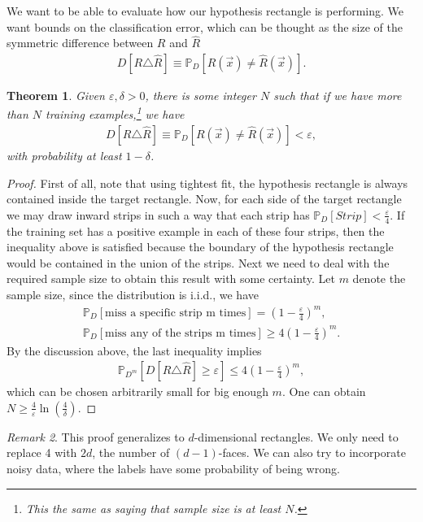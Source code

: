 \documentclass[12pt, letterpaper]{article}
\numberwithin{equation}{section} %
\newcommand{\mb}{\mathbb}
\newcommand{\ve}{\varepsilon}
\newtheorem{theorem}{Theorem}[section]
\theoremstyle{definition}
\theoremstyle{remark}
\newtheorem{remark}[theorem]{Remark}
\begin{document}
We want to be able to evaluate how our hypothesis rectangle is performing.
We want bounds on the classification error, which can be thought as the size of the symmetric difference between $R$ and $\hat R$
\begin{align}
	D[R\triangle \hat R] \equiv \mb P_D[R(\vec x) \ne \hat R(\vec x)].
\end{align}

\begin{theorem}
	Given $\ve,\delta >0$, there is some integer $N$ such that if we have more than $N$ training examples,\footnote{This the same as saying that sample size is at least $N$.} we have
	\begin{align}
		D[R\triangle \hat R] \equiv \mb P_D[R(\vec x) \ne \hat R(\vec x)] < \ve,
	\end{align}
	with probability at least $1-\delta$.
\end{theorem}

\begin{proof}
	First of all, note that using tightest fit, the hypothesis rectangle is always contained inside the target rectangle.
	Now, for each side of the target rectangle we may draw inward strips in such a way that each strip has $\mb P_D[Strip] < \frac{\ve}{4}$.
	If the training set has a positive example in each of these four strips, then the inequality above is satisfied because the boundary of the hypothesis rectangle would be contained in the union of the strips.
	Next we need to deal with the required sample size to obtain this result with some certainty.
	Let $m$ denote the sample size, since the distribution is i.i.d., we have
	\begin{align*}
		\mb P_D[\textrm{miss a specific strip m times}] = \left(1-\frac{\ve}{4}\right)^m,\\
		\mb P_D[\textrm{miss any of the strips m times}] \geq 4\left(1-\frac{\ve}{4}\right)^m.
	\end{align*}
	By the discussion above, the last inequality implies
	\begin{align*}
		\mb P_{D^m}[D[R\triangle\hat R]\geq \ve] \leq 4\left(1-\frac{\ve}{4}\right)^m,
	\end{align*}
	which can be chosen arbitrarily small for big enough $m$.
	One can obtain $N\geq \frac4\ve \ln\left(\frac4\delta\right)$.
\end{proof}

\begin{remark}
	This proof generalizes to $d$-dimensional rectangles.
	We only need to replace 4 with $2d$, the number of $(d-1)$-faces.
	We can also try to incorporate noisy data, where the labels have some probability of being wrong.
\end{remark}
\end{document}
